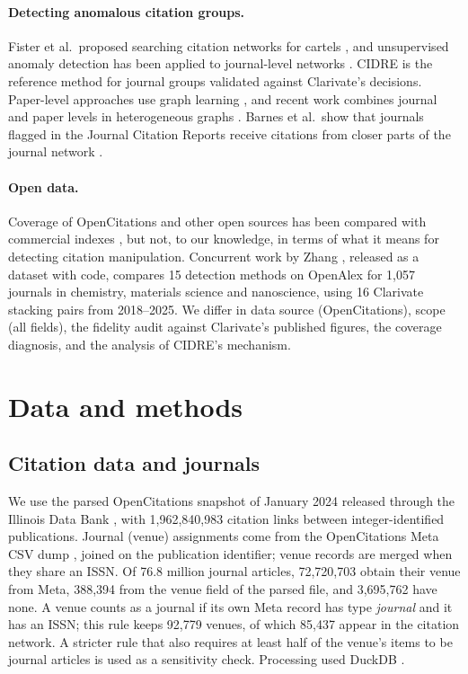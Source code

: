 \documentclass[11pt]{article}
\begin{document}
\paragraph{Detecting anomalous citation groups.}
Fister et al.\ proposed searching citation networks for cartels \cite{fister2016cartels}, and unsupervised anomaly
detection has been applied to journal-level networks \cite{jolly2020anomaly}. CIDRE \cite{kojaku2021cidre} is the
reference method for journal groups validated against Clarivate's decisions. Paper-level approaches use graph learning
\cite{liu2022tnnls}, and recent work combines journal and paper levels in heterogeneous graphs \cite{liu2026isf}.
Barnes et al.\ show that journals flagged in the Journal Citation Reports receive citations from closer parts of the
journal network \cite{barnes2026distance}.

\paragraph{Open data.}
Coverage of OpenCitations and other open sources has been compared with commercial indexes
\cite{martinmartin2021coverage,visser2021comparison,culbert2025openalex}, but not, to our knowledge, in terms of what it
means for detecting citation manipulation. Concurrent work by Zhang \cite{zhang2026openalex}, released as a dataset
with code, compares 15 detection methods on OpenAlex for 1,057 journals in chemistry, materials science and
nanoscience, using 16 Clarivate stacking pairs from 2018--2025. We differ in data source (OpenCitations), scope (all
fields), the fidelity audit against Clarivate's published figures, the coverage diagnosis, and the analysis of
CIDRE's mechanism.

\section{Data and methods}\label{sec:methods}

\subsection{Citation data and journals}
We use the parsed OpenCitations snapshot of January 2024 released through the Illinois Data Bank
\cite{arjomandi2024dataset}, with 1,962,840,983 citation links between integer-identified publications. Journal
(venue) assignments come from the OpenCitations Meta CSV dump \cite{ocmeta2024dump,massari2024meta}, joined on the
publication identifier; venue records are merged when they share an ISSN. Of 76.8 million journal articles,
72,720,703 obtain their venue from Meta, 388,394 from the venue field of the parsed file, and 3,695,762 have none. A
venue counts as a journal if its own Meta record has type \emph{journal} and it has an ISSN; this rule keeps 92,779
venues, of which 85,437 appear in the citation network. A stricter rule that also requires at least half of the
venue's items to be journal articles is used as a sensitivity check. Processing used DuckDB \cite{raasveldt2019duckdb}.
\end{document}
